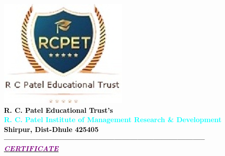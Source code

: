 \thispagestyle{empty}
\begin{center}
\includegraphics[scale=0.5]{Certi/111}\\[0.1cm]
\normalsize \bfseries \textcolor{black} {R. C. Patel Educational Trust's}\\[0.1cm]
\LARGE \bfseries \textcolor{cyan} {R. C. Patel Institute of Management Research \& Development }\\[0.1cm]
\large \bfseries \textcolor{black} {Shirpur, Dist-Dhule 425405}\\[0.1cm]
----------------------------------------------------------------------------- \\[0.9cm]

\underline{\textit{\LARGE \textcolor{purple} {CERTIFICATE}}}\\[0.1cm]
\end{center}
